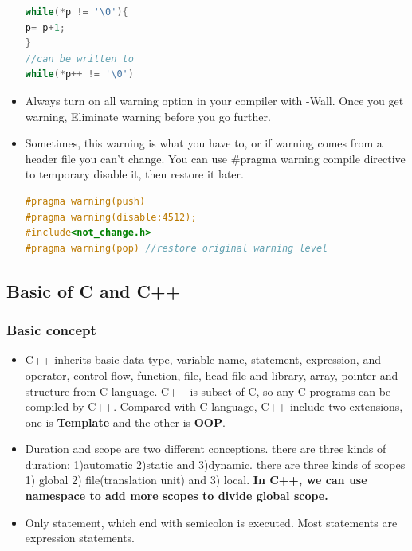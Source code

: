 \documentclass[a4paper,12pt,twoside]{book}
\begin{document}
\begin{itemize}
\begin{lstlisting}[frame=single, language=c++]
while(*p != '\0'){
p= p+1;
}
//can be written to
while(*p++ != '\0')
\end{lstlisting}

\item Always turn on all warning option in your compiler with -Wall. Once you get warning, Eliminate warning before you go further.

\item Sometimes, this warning is what you have to, or if warning comes from a header file you can't change. You can use \#pragma warning compile directive to temporary disable it, then restore it later.
\begin{lstlisting}[frame=single, language=c++]
#pragma warning(push)
#pragma warning(disable:4512);
#include<not_change.h>
#pragma warning(pop) //restore original warning level
\end{lstlisting}

\end{itemize}

\subsection{Basic of C and C++}
\subsubsection{Basic concept}
\begin{itemize}
\item C++ inherits basic data type, variable name, statement, expression, and operator, control flow, function, file, head file and library, array, pointer and structure from C language. C++ is subset of C, so any C programs can be compiled by C++. Compared with C language,  C++ include two extensions, one is \textbf{Template} and the other is \textbf{OOP}.

\item Duration and scope are two different conceptions. there are three kinds of duration: 1)automatic 2)static and 3)dynamic. there are three kinds of scopes 1) global 2) file(translation unit) and 3) local. \textbf{In C++, we can use namespace to add more scopes to divide global scope. }

\item Only statement, which end with semicolon is executed. Most statements are expression statements.

\end{itemize}
\end{document}

